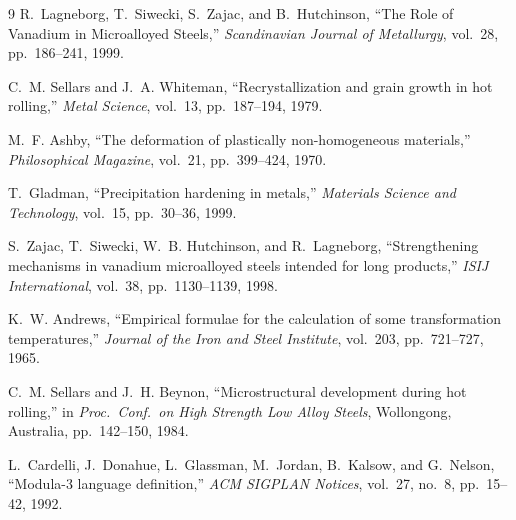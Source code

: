 \documentclass[11pt,a4paper]{article}
\begin{document}
\begin{thebibliography}{9}
  R.~Lagneborg, T.~Siwecki, S.~Zajac, and B.~Hutchinson,
  ``The Role of Vanadium in Microalloyed Steels,''
  \emph{Scandinavian Journal of Metallurgy}, vol.~28, pp.~186--241, 1999.

  C.~M. Sellars and J.~A. Whiteman,
  ``Recrystallization and grain growth in hot rolling,''
  \emph{Metal Science}, vol.~13, pp.~187--194, 1979.

  M.~F. Ashby,
  ``The deformation of plastically non-homogeneous materials,''
  \emph{Philosophical Magazine}, vol.~21, pp.~399--424, 1970.

  T.~Gladman,
  ``Precipitation hardening in metals,''
  \emph{Materials Science and Technology}, vol.~15, pp.~30--36, 1999.

  S.~Zajac, T.~Siwecki, W.~B. Hutchinson, and R.~Lagneborg,
  ``Strengthening mechanisms in vanadium microalloyed steels intended for
  long products,''
  \emph{ISIJ International}, vol.~38, pp.~1130--1139, 1998.

  K.~W. Andrews,
  ``Empirical formulae for the calculation of some transformation
  temperatures,''
  \emph{Journal of the Iron and Steel Institute}, vol.~203, pp.~721--727, 1965.

  C.~M. Sellars and J.~H. Beynon,
  ``Microstructural development during hot rolling,''
  in \emph{Proc.\ Conf.\ on High Strength Low Alloy Steels},
  Wollongong, Australia, pp.~142--150, 1984.

  L.~Cardelli, J.~Donahue, L.~Glassman, M.~Jordan, B.~Kalsow, and G.~Nelson,
  ``Modula-3 language definition,''
  \emph{ACM SIGPLAN Notices}, vol.~27, no.~8, pp.~15--42, 1992.
\end{thebibliography}
\end{document}

